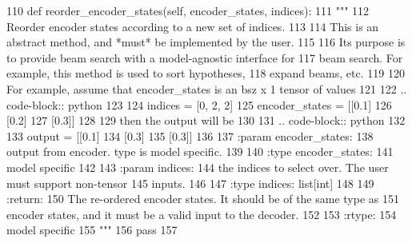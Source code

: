 \begin{DoxyCode}
110     \textcolor{keyword}{def }reorder\_encoder\_states(self, encoder\_states, indices):
111         \textcolor{stringliteral}{"""}
112 \textcolor{stringliteral}{        Reorder encoder states according to a new set of indices.}
113 \textcolor{stringliteral}{}
114 \textcolor{stringliteral}{        This is an abstract method, and *must* be implemented by the user.}
115 \textcolor{stringliteral}{}
116 \textcolor{stringliteral}{        Its purpose is to provide beam search with a model-agnostic interface for}
117 \textcolor{stringliteral}{        beam search. For example, this method is used to sort hypotheses,}
118 \textcolor{stringliteral}{        expand beams, etc.}
119 \textcolor{stringliteral}{}
120 \textcolor{stringliteral}{        For example, assume that encoder\_states is an bsz x 1 tensor of values}
121 \textcolor{stringliteral}{}
122 \textcolor{stringliteral}{        .. code-block:: python}
123 \textcolor{stringliteral}{}
124 \textcolor{stringliteral}{            indices = [0, 2, 2]}
125 \textcolor{stringliteral}{            encoder\_states = [[0.1]}
126 \textcolor{stringliteral}{                              [0.2]}
127 \textcolor{stringliteral}{                              [0.3]]}
128 \textcolor{stringliteral}{}
129 \textcolor{stringliteral}{        then the output will be}
130 \textcolor{stringliteral}{}
131 \textcolor{stringliteral}{        .. code-block:: python}
132 \textcolor{stringliteral}{}
133 \textcolor{stringliteral}{            output = [[0.1]}
134 \textcolor{stringliteral}{                      [0.3]}
135 \textcolor{stringliteral}{                      [0.3]]}
136 \textcolor{stringliteral}{}
137 \textcolor{stringliteral}{        :param encoder\_states:}
138 \textcolor{stringliteral}{            output from encoder. type is model specific.}
139 \textcolor{stringliteral}{}
140 \textcolor{stringliteral}{        :type encoder\_states:}
141 \textcolor{stringliteral}{            model specific}
142 \textcolor{stringliteral}{}
143 \textcolor{stringliteral}{        :param indices:}
144 \textcolor{stringliteral}{            the indices to select over. The user must support non-tensor}
145 \textcolor{stringliteral}{            inputs.}
146 \textcolor{stringliteral}{}
147 \textcolor{stringliteral}{        :type indices: list[int]}
148 \textcolor{stringliteral}{}
149 \textcolor{stringliteral}{        :return:}
150 \textcolor{stringliteral}{            The re-ordered encoder states. It should be of the same type as}
151 \textcolor{stringliteral}{            encoder states, and it must be a valid input to the decoder.}
152 \textcolor{stringliteral}{}
153 \textcolor{stringliteral}{        :rtype:}
154 \textcolor{stringliteral}{            model specific}
155 \textcolor{stringliteral}{        """}
156         \textcolor{keywordflow}{pass}
157 
\end{DoxyCode}


